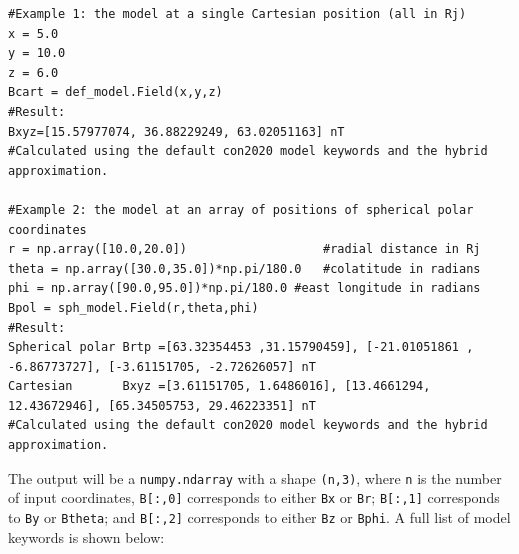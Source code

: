 	\begin{verbatim}
#Example 1: the model at a single Cartesian position (all in Rj)
x = 5.0
y = 10.0
z = 6.0
Bcart = def_model.Field(x,y,z)
#Result:
Bxyz=[15.57977074, 36.88229249, 63.02051163] nT
#Calculated using the default con2020 model keywords and the hybrid approximation.
	
#Example 2: the model at an array of positions of spherical polar coordinates
r = np.array([10.0,20.0])					#radial distance in Rj
theta = np.array([30.0,35.0])*np.pi/180.0	#colatitude in radians 
phi = np.array([90.0,95.0])*np.pi/180.0	#east longitude in radians
Bpol = sph_model.Field(r,theta,phi)
#Result:
Spherical polar Brtp =[63.32354453 ,31.15790459], [-21.01051861 , -6.86773727], [-3.61151705, -2.72626057] nT
Cartesian       Bxyz =[3.61151705, 1.6486016], [13.4661294,  12.43672946], [65.34505753, 29.46223351] nT
#Calculated using the default con2020 model keywords and the hybrid approximation.
	\end{verbatim}
	
	The output will be a \texttt{numpy.ndarray} with a shape \texttt{(n,3)}, where \texttt{n} is the number of input coordinates, \texttt{B[:,0]} corresponds to either \texttt{Bx} or \texttt{Br}; \texttt{B[:,1]} corresponds to \texttt{By} or \texttt{Btheta}; and \texttt{B[:,2]} corresponds to either \texttt{Bz} or \texttt{Bphi}.  A full list of model keywords is shown below:
	
